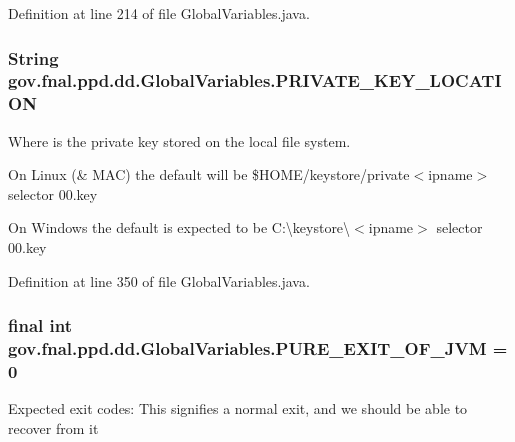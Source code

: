 Definition at line 214 of file Global\-Variables.\-java.

\hypertarget{classgov_1_1fnal_1_1ppd_1_1dd_1_1GlobalVariables_aa26c21d05850efb85c8f5517d8258e5d}{
\subsubsection[{P\-R\-I\-V\-A\-T\-E\-\_\-\-K\-E\-Y\-\_\-\-L\-O\-C\-A\-T\-I\-O\-N}]{\setlength{\rightskip}{0pt plus 5cm}String gov.\-fnal.\-ppd.\-dd.\-Global\-Variables.\-P\-R\-I\-V\-A\-T\-E\-\_\-\-K\-E\-Y\-\_\-\-L\-O\-C\-A\-T\-I\-O\-N\hspace{0.3cm}{\ttfamily [static]}}}\label{classgov_1_1fnal_1_1ppd_1_1dd_1_1GlobalVariables_aa26c21d05850efb85c8f5517d8258e5d}
Where is the private key stored on the local file system.

On Linux (\& M\-A\-C) the default will be \$\-H\-O\-M\-E/keystore/private$<$ipname$>$ selector 00.\-key

On Windows the default is expected to be C\-:\textbackslash{}keystore\textbackslash{}$<$ipname$>$ selector 00.\-key 

Definition at line 350 of file Global\-Variables.\-java.

\hypertarget{classgov_1_1fnal_1_1ppd_1_1dd_1_1GlobalVariables_a9a5a3b99227fe4929fc0c3c664a922da}{
\subsubsection[{P\-U\-R\-E\-\_\-\-E\-X\-I\-T\-\_\-\-O\-F\-\_\-\-J\-V\-M}]{\setlength{\rightskip}{0pt plus 5cm}final int gov.\-fnal.\-ppd.\-dd.\-Global\-Variables.\-P\-U\-R\-E\-\_\-\-E\-X\-I\-T\-\_\-\-O\-F\-\_\-\-J\-V\-M = 0\hspace{0.3cm}{\ttfamily [static]}}}\label{classgov_1_1fnal_1_1ppd_1_1dd_1_1GlobalVariables_a9a5a3b99227fe4929fc0c3c664a922da}
Expected exit codes\-: This signifies a normal exit, and we should be able to recover from it 

